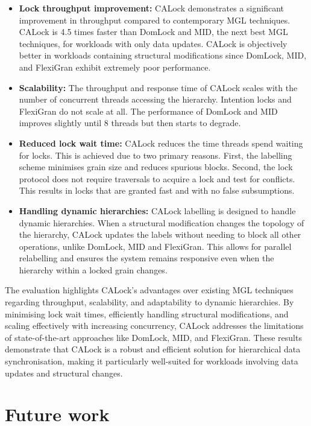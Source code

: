 \begin{itemize}
    \item \textbf{Lock throughput improvement:} CALock demonstrates a significant improvement in throughput compared to contemporary MGL techniques. CALock is 4.5 times faster than DomLock and MID, the next best MGL techniques, for workloads with only data updates. CALock is objectively better in workloads containing structural modifications since DomLock, MID, and FlexiGran exhibit extremely poor performance. 

    \item \textbf{Scalability:} The throughput and response time of CALock scales with the number of concurrent threads accessing the hierarchy. Intention locks and FlexiGran do not scale at all. The performance of DomLock and MID improves slightly until 8 threads but then starts to degrade. 
    
    \item \textbf{Reduced lock wait time:} CALock reduces the time threads spend waiting for locks. This is achieved due to two primary reasons. First, the labelling scheme minimises grain size and reduces spurious blocks. Second, the lock protocol does not require traversals to acquire a lock and test for conflicts. This results in locks that are granted fast and with no false subsumptions. 

    \item \textbf{Handling dynamic hierarchies:} CALock labelling is designed to handle dynamic hierarchies. When a structural modification changes the topology of the hierarchy, CALock updates the labels without needing to block all other operations, unlike DomLock, MID and FlexiGran. This allows for parallel relabelling and ensures the system remains responsive even when the hierarchy within a locked grain changes.  
\end{itemize}


The evaluation highlights CALock's advantages over existing MGL techniques regarding throughput, scalability, and adaptability to dynamic hierarchies. By minimising lock wait times, efficiently handling structural modifications, and scaling effectively with increasing concurrency, CALock addresses the limitations of state-of-the-art approaches like DomLock, MID, and FlexiGran. These results demonstrate that CALock is a robust and efficient solution for hierarchical data synchronisation, making it particularly well-suited for workloads involving data updates and structural changes.


\section{Future work}

